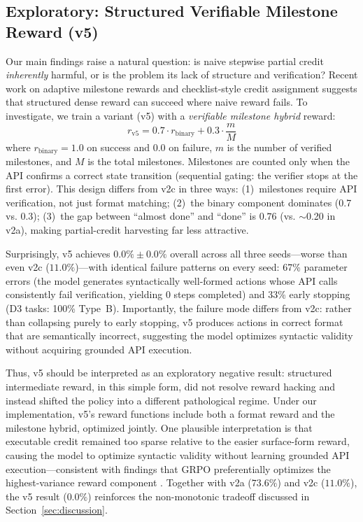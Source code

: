 \documentclass[11pt]{article}
\begin{document}
\subsection{Exploratory: Structured Verifiable Milestone Reward (v5)}
\label{sec:v5}

Our main findings raise a natural question: is naive stepwise partial credit \emph{inherently} harmful, or is the problem its lack of structure and verification? Recent work on adaptive milestone rewards \citep{admire2025} and checklist-style credit assignment \citep{cm2_2025} suggests that structured dense reward can succeed where naive reward fails.
To investigate, we train a variant (v5) with a \emph{verifiable milestone hybrid} reward:
\begin{equation}
r_{\text{v5}} = 0.7 \cdot r_{\text{binary}} + 0.3 \cdot \frac{m}{M}
\end{equation}
where $r_{\text{binary}} = 1.0$ on success and $0.0$ on failure, $m$ is the number of verified milestones, and $M$ is the total milestones. Milestones are counted only when the API confirms a correct state transition (sequential gating: the verifier stops at the first error).
This design differs from v2c in three ways: (1)~milestones require API verification, not just format matching; (2)~the binary component dominates (0.7 vs. 0.3); (3)~the gap between ``almost done'' and ``done'' is $0.76$ (vs. $\sim$0.20 in v2a), making partial-credit harvesting far less attractive.

Surprisingly, v5 achieves $0.0\% \pm 0.0\%$ overall across all three seeds---worse than even v2c ($11.0\%$)---with identical failure patterns on every seed: 67\% parameter errors (the model generates syntactically well-formed actions whose API calls consistently fail verification, yielding 0 steps completed) and 33\% early stopping (D3 tasks: 100\% Type~B).
Importantly, the failure mode differs from v2c: rather than collapsing purely to early stopping, v5 produces actions in correct format that are semantically incorrect, suggesting the model optimizes syntactic validity without acquiring grounded API execution.

Thus, v5 should be interpreted as an exploratory negative result: structured intermediate reward, in this simple form, did not resolve reward hacking and instead shifted the policy into a different pathological regime.
Under our implementation, v5's reward functions include both a format reward and the milestone hybrid, optimized jointly.
One plausible interpretation is that executable credit remained too sparse relative to the easier surface-form reward, causing the model to optimize syntactic validity without learning grounded API execution---consistent with findings that GRPO preferentially optimizes the highest-variance reward component \citep{mogrpo2025,fontana2025hidden}.
Together with v2a ($73.6\%$) and v2c ($11.0\%$), the v5 result ($0.0\%$) reinforces the non-monotonic tradeoff discussed in Section~\ref{sec:discussion}.
\end{document}
